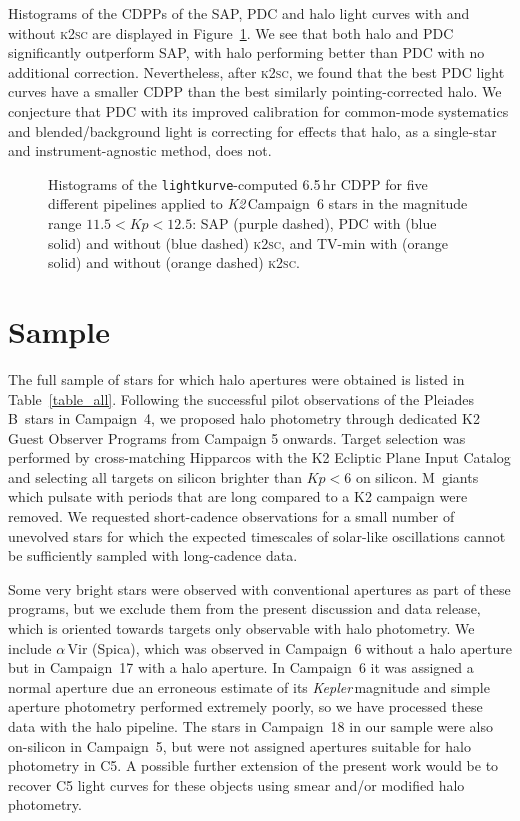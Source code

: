 \documentclass[modern]{aastex62}
\newcommand\kepler{\emph{Kepler}\,}
\newcommand\ktwo{\emph{K2}\,}
\begin{document}
Histograms of the CDPPs of the SAP, PDC and halo light curves with and without \textsc{k2sc} are displayed in Figure~\ref{fig:cdpphists}. We see that both halo and PDC significantly outperform SAP, with halo performing better than PDC with no additional correction. Nevertheless, after \textsc{k2sc}, we found that the best PDC light curves have a smaller CDPP than the best similarly pointing-corrected halo. We conjecture that PDC with its improved calibration for common-mode systematics and blended/background light is correcting for effects that halo, as a single-star and instrument-agnostic method, does not.

\begin{figure}
\caption{Histograms of the \texttt{lightkurve}-computed 6.5\,hr CDPP for five different pipelines applied to \ktwo Campaign~6 stars in the magnitude range $11.5 < Kp < 12.5$: SAP (purple dashed), PDC with (blue solid) and without (blue dashed) \textsc{k2sc}, and TV-min with (orange solid) and without (orange dashed) \textsc{k2sc}.}
\label{fig:cdpphists}
\end{figure}


\section{Sample}
\label{sec:sample}


The full sample of stars for which halo apertures were obtained is listed in Table~\ref{table_all}. Following the successful pilot observations of the Pleiades B~stars in Campaign~4, we proposed halo photometry through dedicated K2 Guest Observer Programs from Campaign 5 onwards. Target selection was performed by cross-matching Hipparcos \citep{leeuwen07} with the K2 Ecliptic Plane Input Catalog \citep[EPIC,][]{huber16} and selecting all targets on silicon brighter than $Kp < 6$ on silicon. M~giants which pulsate with periods that are long compared to a K2 campaign were removed. We requested short-cadence observations for a small number of unevolved stars for which the expected timescales of solar-like oscillations cannot be sufficiently sampled with long-cadence data.


 Some very bright stars were observed with conventional apertures as part of these programs, but we exclude them from the present discussion and data release, which is oriented towards targets only observable with halo photometry. 
We include $\alpha$\,Vir (Spica), which was observed in Campaign~6 without a halo aperture but in Campaign~17 with a halo aperture. In Campaign~6 it was assigned a normal aperture due an erroneous estimate of its \kepler magnitude and simple aperture photometry performed extremely poorly, so we have processed these data with the halo pipeline. The stars in Campaign~18 in our sample were also on-silicon in Campaign~5, but were not assigned apertures suitable for halo photometry in C5. A possible further extension of the present work would be to recover C5 light curves for these objects using smear and/or modified halo photometry.
\end{document}

